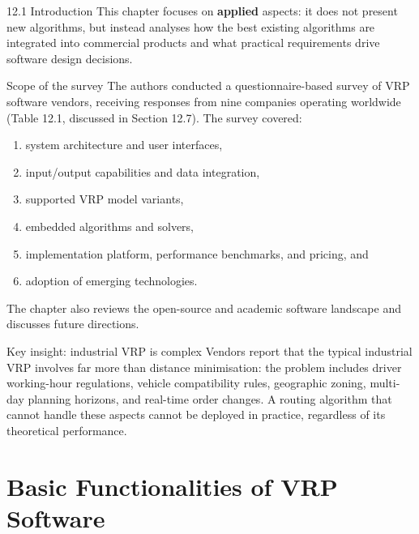 \documentclass[aspectratio=169,10pt]{beamer}
\begin{document}
\begin{frame}[allowframebreaks]{12.1 \; Introduction}
  \medskip
  This chapter focuses on \textbf{applied} aspects: it does not present new
  algorithms, but instead analyses how the best existing algorithms are
  integrated into commercial products and what practical requirements drive
  software design decisions.

  \framebreak

  \begin{block}{Scope of the survey}
    The authors conducted a questionnaire-based survey of VRP software vendors,
    receiving responses from nine companies operating worldwide
    (Table 12.1, discussed in Section 12.7).
    The survey covered:
    \begin{enumerate}
      \item system architecture and user interfaces,
      \item input/output capabilities and data integration,
      \item supported VRP model variants,
      \item embedded algorithms and solvers,
      \item implementation platform, performance benchmarks, and pricing, and
      \item adoption of emerging technologies.
    \end{enumerate}
    The chapter also reviews the open-source and academic software landscape
    and discusses future directions.
  \end{block}

  \begin{alertblock}{Key insight: industrial VRP is complex}
    Vendors report that the typical industrial VRP involves far more than distance
    minimisation: the problem includes driver working-hour regulations, vehicle
    compatibility rules, geographic zoning, multi-day planning horizons, and
    real-time order changes.
    A routing algorithm that cannot handle these aspects cannot be deployed in
    practice, regardless of its theoretical performance.
  \end{alertblock}
\end{frame}

\section{Basic Functionalities of VRP Software}
\end{document}
